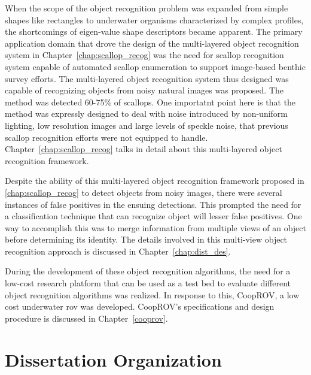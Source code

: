 \documentclass {udthesis}
\begin{document}
When the scope of the object recognition problem was expanded from simple shapes like rectangles to underwater organisms characterized by complex profiles,
the shortcomings of eigen-value shape descriptors became apparent. The primary application domain that drove the design of the multi-layered object recognition system in Chapter~\ref{chap:scallop_recog} was the need for 
scallop recognition system capable of automated scallop enumeration to support image-based benthic survey efforts. 
The multi-layered object recognition system thus designed was capable of recognizing objects from noisy natural images was proposed. The method was detected 60-75\% of scallops. One importatnt point here is that the method was expressly designed to deal with noise introduced by non-uniform lighting, low resolution images and large levels of speckle noise, that previous scallop recognition efforts were not equipped to handle. Chapter~\ref{chap:scallop_recog} talks in detail about this multi-layered object recognition framework.

Despite the ability of this multi-layered object recognition framework proposed in \ref{chap:scallop_recog} to detect objects from noisy images, there were 
several instances of false positives in the ensuing detections. This prompted the need for a classification technique that can recognize object will lesser
false positives. One way to accomplish this was to merge information from multiple views of an object before determining its identity. The details involved in this
multi-view object recognition approach is discussed in Chapter~\ref{chap:dist_des}.

During the development of these object recognition algorithms, the need for a low-cost research platform 
that can be used as a test bed to evaluate different object recognition algorithms was realized.
In response to this, CoopROV, a low cost underwater \gls{rov} was developed. CoopROV's specifications and 
design procedure is discussed in Chapter~\ref{cooprov}.

\section{Dissertation Organization}
\end{document}
